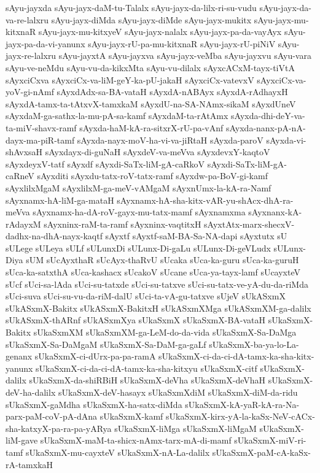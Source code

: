 {sAyu-jayxda
sAyu-jayx-daM-tu-Talalx
sAyu-jayx-da-lilx-ri-su-vudu
sAyu-jayx-da-va-re-lalxru
sAyu-jayx-diMda
sAyu-jayx-diMde
sAyu-jayx-mukitx
sAyu-jayx-mu-kitxnaR
sAyu-jayx-mu-kitxyeV
sAyu-jayx-nalalx
sAyu-jayx-pa-da-vayAyx
sAyu-jayx-pa-da-vi-yanunx
sAyu-jayx-rU-pa-mu-kitxnaR
sAyu-jayx-rU-piNiV
sAyu-jayx-re-lalxru
sAyu-jayxtA
sAyu-jayxva
sAyu-jayx-veMba
sAyu-jayxvu
sAyu-vara
sAyu-ve-neMdu
sAyu-vu-da-kikxMta
sAyu-vu-dilalx
sAyxcACxM-tayx-tiVtA
sAyxciCxva
sAyxciCx-va-liM-geY-ka-pU-jakaH
sAyxciCx-vatevxV
sAyxciCx-va-yoV-gi-nAmf
sAyxdAdx-sa-BA-vataH
sAyxdA-nABAyx
sAyxdA-rAdhayxH
sAyxdA-tamx-ta-tAtxvX-tamxkaM
sAyxdU-na-SA-NAmx-sikaM
sAyxdUneV
sAyxdaM-ga-sathx-la-mu-pA-sa-kamf
sAyxdaM-ta-rAtAmx
sAyxda-dhi-deY-va-ta-miV-shavx-ramf
sAyxda-haM-kA-ra-sitxrX-rU-pa-vAnf
sAyxda-nanx-pA-nA-dayx-ma-piR-tamf
sAyxda-nayx-moV-ha-vi-va-jiRtaH
sAyxda-paroV
sAyxda-vi-shAvxsaH
sAyxdayx-di-guNaH
sAyxdeV-va-meVva
sAyxdevxY-kaqtoV
sAyxdeyxV-tatf
sAyxdf
sAyxdi-SaTx-liM-gA-caRkoV
sAyxdi-SaTx-liM-gA-caRneV
sAyxditi
sAyxdu-tatx-roV-tatx-ramf
sAyxdw-pa-BoV-gi-kamf
sAyxlilxMgaM
sAyxlilxM-ga-meV-vAMgaM
sAyxnUmx-la-kA-ra-Namf
sAyxnamx-hA-liM-ga-mataH
sAyxnamx-hA-sha-kitx-vAR-yu-shAcx-dhA-ra-meVva
sAyxnamx-ha-dA-roV-gayx-mu-tatx-mamf
sAyxnamxma
sAyxnanx-kA-rAdayxM
sAyxninx-raM-ta-ramf
sAyxninx-vaqtitxH
sAyxtAtx-marx-shecxV-dadhx-na-dhA-nayx-kaqtf
sAyxtf
sAyxtf-saM-BA-Sa-NA-dapi
sAyxtutx
sU
sULege
sULeya
sULf
sULunxDi
sULunx-Di-gaLu
sULunx-Di-geVLudx
sULunx-Diya
sUM
sUcAyxthaR
sUcAyx-thaRvU
sUcaka
sUca-ka-guru
sUca-ka-guruH
sUca-ka-satxthA
sUca-kashacx
sUcakoV
sUcane
sUca-ya-tayx-lamf
sUcayxteV
sUcf
sUci-sa-lAda
sUci-su-tatxde
sUci-su-tatxve
sUci-su-tatx-ve-yA-du-da-riMda
sUci-suva
sUci-su-vu-da-riM-dalU
sUci-ta-vA-gu-tatxve
sUjeV
sUkASxmX
sUkASxmX-Bakitx
sUkASxmX-BakitxH
sUkASxmXMga
sUkASxmXM-ga-dalilx
sUkASxmX-thARnf
sUkASxmXya
sUkaSxmX
sUkaSxmX-BA-vataH
sUkaSxmX-Bakitx
sUkaSxmXM
sUkaSxmXM-ga-LeM-do-da-vida
sUkaSxmX-Sa-DaMga
sUkaSxmX-Sa-DaMgaM
sUkaSxmX-Sa-DaM-ga-gaLf
sUkaSxmX-ba-ya-lo-La-genanx
sUkaSxmX-ci-dUrx-pa-pa-ramA
sUkaSxmX-ci-da-ci-dA-tamx-ka-sha-kitx-yanunx
sUkaSxmX-ci-da-ci-dA-tamx-ka-sha-kitxyu
sUkaSxmX-citf
sUkaSxmX-dalilx
sUkaSxmX-da-shiRBiH
sUkaSxmX-deVha
sUkaSxmX-deVhaH
sUkaSxmX-deV-ha-dalilx
sUkaSxmX-deV-hasayx
sUkaSxmXdiM
sUkaSxmX-diM-da-ridu
sUkaSxmX-gaMdha
sUkaSxmX-ha-satx-diMda
sUkaSxmX-kA-yaR-kA-ra-Na-parx-paM-coV-pA-dAna
sUkaSxmX-kamf
sUkaSxmX-kirx-yA-la-kaSx-NeV-cACx-sha-katxyX-pa-ra-pa-yARya
sUkaSxmX-liMga
sUkaSxmX-liMgaM
sUkaSxmX-liM-gave
sUkaSxmX-maM-ta-shicx-nAmx-tarx-mA-di-mamf
sUkaSxmX-miV-ri-tamf
sUkaSxmX-mu-cayxteV
sUkaSxmX-nA-La-dalilx
sUkaSxmX-paM-cA-kaSx-rA-tamxkaH
}
